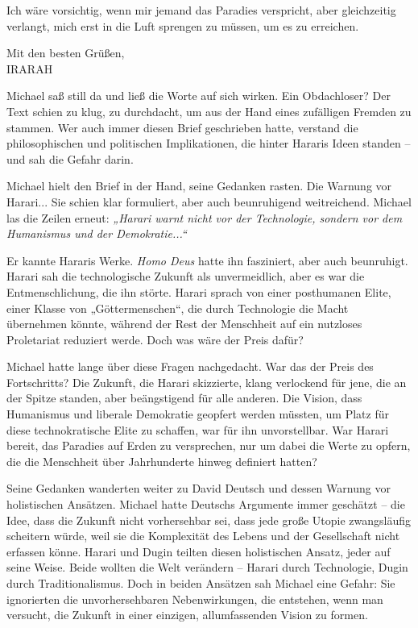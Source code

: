 \documentclass[
]{article}
\begin{document}
Ich wäre vorsichtig, wenn mir jemand das Paradies verspricht, aber
gleichzeitig verlangt, mich erst in die Luft sprengen zu müssen, um es
zu erreichen.

Mit den besten Grüßen,\\
IRARAH

Michael saß still da und ließ die Worte auf sich wirken. Ein
Obdachloser? Der Text schien zu klug, zu durchdacht, um aus der Hand
eines zufälligen Fremden zu stammen. Wer auch immer diesen Brief
geschrieben hatte, verstand die philosophischen und politischen
Implikationen, die hinter Hararis Ideen standen -- und sah die Gefahr
darin.

Michael hielt den Brief in der Hand, seine Gedanken rasten. Die Warnung
vor Harari... Sie schien klar formuliert, aber auch beunruhigend
weitreichend. Michael las die Zeilen erneut: \emph{„Harari warnt nicht
vor der Technologie, sondern vor dem Humanismus und der Demokratie...``}

Er kannte Hararis Werke. \emph{Homo Deus} hatte ihn fasziniert, aber
auch beunruhigt. Harari sah die technologische Zukunft als
unvermeidlich, aber es war die Entmenschlichung, die ihn störte. Harari
sprach von einer posthumanen Elite, einer Klasse von „Göttermenschen``,
die durch Technologie die Macht übernehmen könnte, während der Rest der
Menschheit auf ein nutzloses Proletariat reduziert werde. Doch was wäre
der Preis dafür?

Michael hatte lange über diese Fragen nachgedacht. War das der Preis des
Fortschritts? Die Zukunft, die Harari skizzierte, klang verlockend für
jene, die an der Spitze standen, aber beängstigend für alle anderen. Die
Vision, dass Humanismus und liberale Demokratie geopfert werden müssten,
um Platz für diese technokratische Elite zu schaffen, war für ihn
unvorstellbar. War Harari bereit, das Paradies auf Erden zu versprechen,
nur um dabei die Werte zu opfern, die die Menschheit über Jahrhunderte
hinweg definiert hatten?

Seine Gedanken wanderten weiter zu David Deutsch und dessen Warnung vor
holistischen Ansätzen. Michael hatte Deutschs Argumente immer geschätzt
-- die Idee, dass die Zukunft nicht vorhersehbar sei, dass jede große
Utopie zwangsläufig scheitern würde, weil sie die Komplexität des Lebens
und der Gesellschaft nicht erfassen könne. Harari und Dugin teilten
diesen holistischen Ansatz, jeder auf seine Weise. Beide wollten die
Welt verändern -- Harari durch Technologie, Dugin durch
Traditionalismus. Doch in beiden Ansätzen sah Michael eine Gefahr: Sie
ignorierten die unvorhersehbaren Nebenwirkungen, die entstehen, wenn man
versucht, die Zukunft in einer einzigen, allumfassenden Vision zu
formen.
\end{document}
